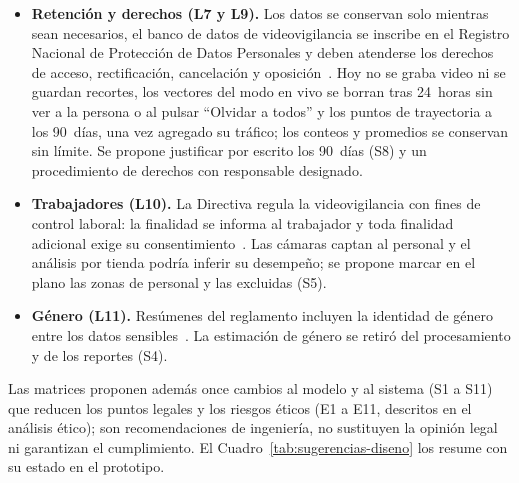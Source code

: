 \documentclass[12pt,a4paper]{article}
\begin{document}
\begin{itemize}
    \item \textbf{Retención y derechos (L7 y L9).} Los datos se conservan solo
    mientras sean necesarios, el banco de datos de videovigilancia se inscribe
    en el Registro Nacional de Protección de Datos Personales y deben atenderse
    los derechos de acceso, rectificación, cancelación y
    oposición~\cite{ley29733,reglamento29733,recordinglaw}. Hoy no se graba
    video ni se guardan recortes, los vectores del modo en vivo se borran tras
    24~horas sin ver a la persona o al pulsar ``Olvidar a todos'' y los puntos
    de trayectoria a los 90~días, una vez agregado su tráfico; los conteos y
    promedios se conservan sin límite. Se propone justificar por escrito los
    90~días (S8) y un procedimiento de derechos con responsable designado.

    \item \textbf{Trabajadores (L10).} La Directiva regula la videovigilancia
    con fines de control laboral: la finalidad se informa al trabajador y toda
    finalidad adicional exige su
    consentimiento~\cite{directiva-videovigilancia,opinion045}. Las cámaras
    captan al personal y el análisis por tienda podría inferir su desempeño;
    se propone marcar en el plano las zonas de personal y las excluidas (S5).

    \item \textbf{Género (L11).} Resúmenes del reglamento incluyen la identidad
    de género entre los datos sensibles~\cite{reglamento29733,recordinglaw}. La
    estimación de género se retiró del procesamiento y de los reportes (S4).
\end{itemize}

Las matrices proponen además once cambios al modelo y al sistema (S1 a S11)
que reducen los puntos legales y los riesgos éticos (E1 a E11, descritos en el
análisis ético); son recomendaciones de ingeniería, no sustituyen la opinión
legal ni garantizan el cumplimiento. El Cuadro~\ref{tab:sugerencias-diseno} los
resume con su estado en el prototipo.
\end{document}
